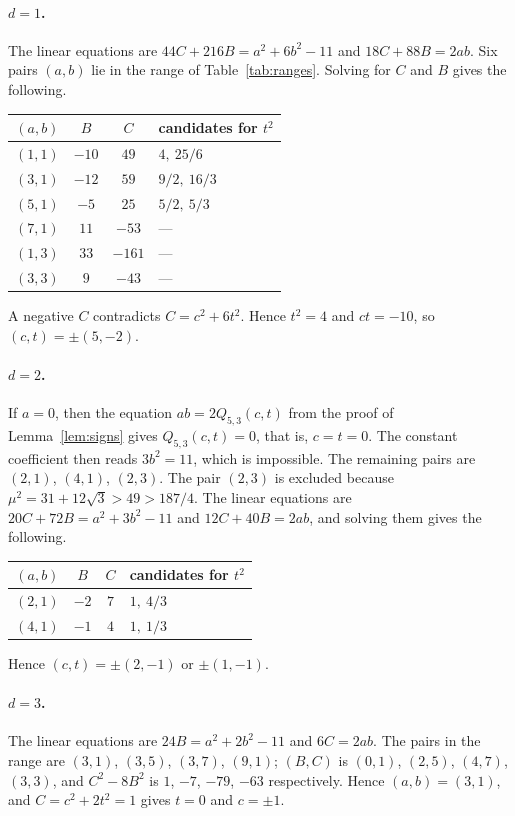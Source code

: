 \documentclass[a4paper,11pt]{article}
\theoremstyle{plain}
\theoremstyle{definition}
\theoremstyle{remark}
\numberwithin{equation}{section}
\numberwithin{table}{section}
\begin{document}
\paragraph{$d=1$.}
The linear equations are $44C+216B=a^2+6b^2-11$ and $18C+88B=2ab$.
Six pairs $(a,b)$ lie in the range of Table~\ref{tab:ranges}. Solving for $C$ and $B$ gives the following.
\begin{center}
\begin{tabular}{cccl}
\toprule
$(a,b)$ & $B$ & $C$ & candidates for $t^2$\\
\midrule
$(1,1)$ & $-10$ & $49$ & $4,\ 25/6$\\
$(3,1)$ & $-12$ & $59$ & $9/2,\ 16/3$\\
$(5,1)$ & $-5$ & $25$ & $5/2,\ 5/3$\\
$(7,1)$ & $11$ & $-53$ & ---\\
$(1,3)$ & $33$ & $-161$ & ---\\
$(3,3)$ & $9$ & $-43$ & ---\\
\bottomrule
\end{tabular}
\end{center}
A negative $C$ contradicts $C=c^2+6t^2$. Hence $t^2=4$ and $ct=-10$, so $(c,t)=\pm(5,-2)$.

\paragraph{$d=2$.}
If $a=0$, then the equation $ab=2Q_{5,3}(c,t)$ from the proof of Lemma~\ref{lem:signs} gives $Q_{5,3}(c,t)=0$, that is, $c=t=0$. The constant coefficient then reads $3b^2=11$, which is impossible.
The remaining pairs are $(2,1)$, $(4,1)$, $(2,3)$. The pair $(2,3)$ is excluded because $\mu^2=31+12\sqrt3>49>187/4$.
The linear equations are $20C+72B=a^2+3b^2-11$ and $12C+40B=2ab$, and solving them gives the following.
\begin{center}
\begin{tabular}{cccl}
\toprule
$(a,b)$ & $B$ & $C$ & candidates for $t^2$\\
\midrule
$(2,1)$ & $-2$ & $7$ & $1,\ 4/3$\\
$(4,1)$ & $-1$ & $4$ & $1,\ 1/3$\\
\bottomrule
\end{tabular}
\end{center}
Hence $(c,t)=\pm(2,-1)$ or $\pm(1,-1)$.

\paragraph{$d=3$.}
The linear equations are $24B=a^2+2b^2-11$ and $6C=2ab$.
The pairs in the range are $(3,1)$, $(3,5)$, $(3,7)$, $(9,1)$; $(B,C)$ is $(0,1)$, $(2,5)$, $(4,7)$, $(3,3)$, and $C^2-8B^2$ is $1$, $-7$, $-79$, $-63$ respectively.
Hence $(a,b)=(3,1)$, and $C=c^2+2t^2=1$ gives $t=0$ and $c=\pm1$.
\end{document}
